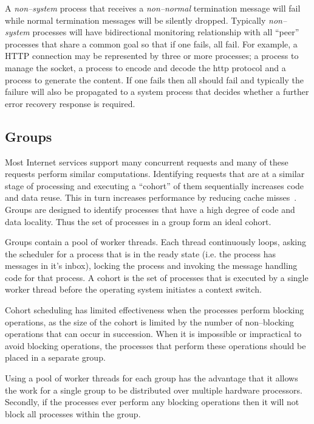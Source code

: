 \documentclass[conference]{IEEEtran}
\begin{document}
A \emph{non--system} process that receives a \emph{non--normal} termination message will fail while normal termination messages will be silently dropped. Typically \emph{non--system} processes will have bidirectional monitoring relationship with all ``peer'' processes that share a common goal so that if one fails, all fail. For example, a HTTP connection may be represented by three or more processes; a process to manage the socket, a process to encode and decode the http protocol and a process to generate the content. If one fails then all should fail and typically the failure will also be propagated to a system process that decides whether a further error recovery response is required.

\subsection{Groups}
\label{section:Groups}

Most Internet services support many concurrent requests and many of these requests perform similar computations. Identifying requests that are at a similar stage of processing and executing a ``cohort'' of them sequentially increases code and data reuse. This in turn increases performance by reducing cache misses~\cite{Larus:2002:Cohort,welsh03Adaptive}. Groups are designed to identify processes that have a high degree of code and data locality. Thus the set of processes in a group form an ideal cohort.

Groups contain a pool of worker threads. Each thread continuously loops, asking the scheduler for a process that is in the ready state (i.e. the process has messages in it's inbox), locking the process and invoking the message handling code for that process. A cohort is the set of processes that is executed by a single worker thread before the operating system initiates a context switch.

Cohort scheduling has limited effectiveness when the processes perform blocking operations, as the size of the cohort is limited by the number of non--blocking operations that can occur in succession. When it is impossible or impractical to avoid blocking operations, the processes that perform these operations should be placed in a separate group.

Using a pool of worker threads for each group has the advantage that it allows the work for a single group to be distributed over multiple hardware processors. Secondly, if the processes ever perform any blocking operations then it will not block all processes within the group. 
\end{document}
